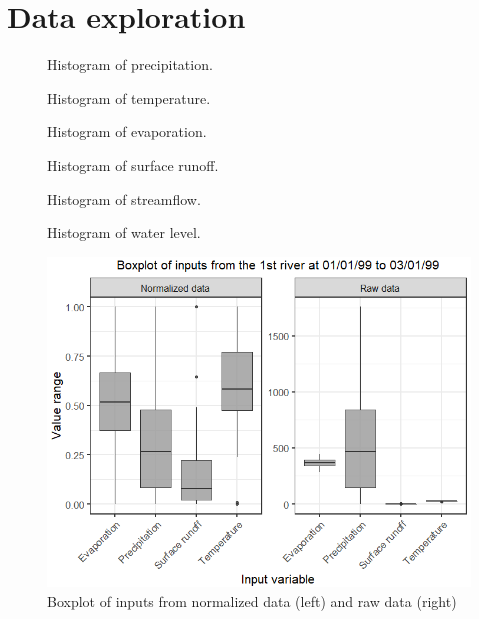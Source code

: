 \section{Data exploration}
\label{sec:DataExploration}

\begin{figure}[H]
  \centering
  
  \caption{Histogram of precipitation.}
\end{figure}

\begin{figure}[H]
  \centering
  
  \caption{Histogram of temperature.}
\end{figure}

\begin{figure}[H]
  \centering
  
  \caption{Histogram of evaporation.}
\end{figure}

\begin{figure}[H]
  \centering
  
  \caption{Histogram of surface runoff.}
\end{figure}

\begin{figure}[H]
  \centering
  
  \caption{Histogram of streamflow.}
\end{figure}

\begin{figure}[H]
  \centering
  
  \caption{Histogram of water level.}
\end{figure}

\begin{figure}[H]
  \centering
  \includegraphics[width=0.8\linewidth, trim=0cm 0 0 .7cm,clip=true]{Figures/Normalização.png}
  \caption{Boxplot of inputs from normalized data (left) and raw data (right)}
  \label{fig:Normalized}
\end{figure}

